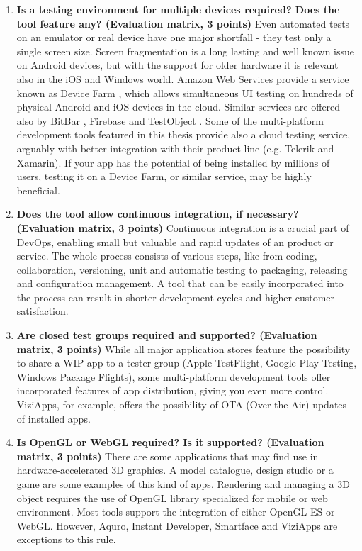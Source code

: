 \documentclass[english,master,public,dept460,male,cpdeclaration,oneside]{diploma}
\begin{document}
\begin{enumerate}
	\item \textbf{Is a testing environment for multiple devices required? Does the tool feature any? (Evaluation matrix, 3 points) }
	Even automated tests on an emulator or real device have one major shortfall - they test only a single screen size. Screen fragmentation is a long lasting and well known issue on Android devices, but with the support for older hardware it is relevant also in the iOS and Windows world. Amazon Web Services provide a service known as Device Farm \cite{awsDeviceFarm}, which allows simultaneous UI testing on hundreds of physical Android and iOS devices in the cloud. Similar services are offered also by BitBar \cite{bitbar}, Firebase \cite{firebase} and TestObject \cite{testObject}. Some of the multi-platform development tools featured in this thesis provide also a cloud testing service, arguably with better integration with their product line (e.g. Telerik and Xamarin). If your app has the potential of being installed by millions of users, testing it on a Device Farm, or similar service, may be highly beneficial.
	
	\item \textbf{Does the tool allow continuous integration, if necessary? (Evaluation matrix, 3 points) }
	Continuous integration is a crucial part of DevOps, enabling small but valuable and rapid updates of an product or service. The whole process consists of various steps, like from coding, collaboration, versioning, unit and automatic testing to packaging, releasing and configuration management. A tool that can be easily incorporated into the process can result in shorter development cycles and higher customer satisfaction.
	
	\item \textbf{Are closed test groups required and supported? (Evaluation matrix, 3 points) }
	While all major application stores feature the possibility to share a WIP app to a tester group (Apple TestFlight, Google Play Testing, Windows Package Flights), some multi-platform development tools offer incorporated features of app distribution, giving you even more control. ViziApps, for example, offers the possibility of OTA (Over the Air) updates of installed apps.
	
	\item \textbf{Is OpenGL or WebGL required? Is it supported? (Evaluation matrix, 3 points) }
	There are some applications that may find use in hardware-accelerated 3D graphics. A model catalogue, design studio or a game are some examples of this kind of apps. Rendering and managing a 3D object requires the use of OpenGL library specialized for mobile or web environment. Most tools support the integration of either OpenGL ES or WebGL. However, Aquro, Instant Developer, Smartface and ViziApps are exceptions to this rule.
	

\end{enumerate}
\end{document}
